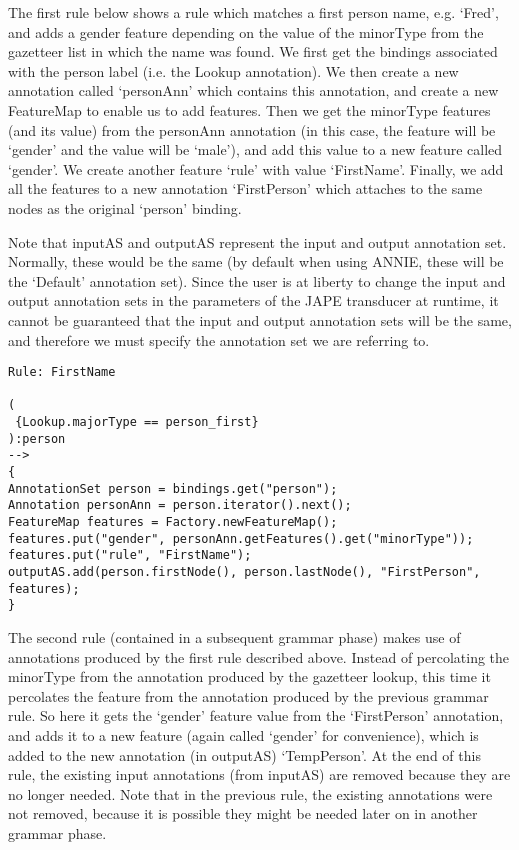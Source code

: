 The first rule below shows a rule which matches a first person name,
e.g. `Fred', and adds a gender feature depending on the value of the
minorType from the gazetteer list in which the name was found.
We first get the bindings associated with the person label (i.e. the
Lookup annotation). We then create a new annotation called
`personAnn' which contains this annotation, and create a new
FeatureMap to enable us to add features. Then we get the minorType
features (and its value) from the personAnn annotation (in this case,
the feature will be `gender' and the value will be `male'), and
add this value to a new feature called `gender'. We create another
feature `rule' with value `FirstName'. Finally, we add all the
features to a new annotation `FirstPerson' which attaches to the
same nodes as the original `person' binding.

Note that inputAS and outputAS represent the input and output
annotation set. Normally, these would be the same (by default when
using ANNIE, these will be the `Default' annotation set). Since the
user is at liberty to change the input and output annotation sets in
the parameters of the JAPE transducer at runtime, it cannot be
guaranteed that the input and output annotation sets will be the same,
and therefore we must specify the annotation set we are referring to.


\begin{small}
\begin{verbatim}
Rule: FirstName

(
 {Lookup.majorType == person_first}
):person
-->
{
AnnotationSet person = bindings.get("person");
Annotation personAnn = person.iterator().next();
FeatureMap features = Factory.newFeatureMap();
features.put("gender", personAnn.getFeatures().get("minorType"));
features.put("rule", "FirstName");
outputAS.add(person.firstNode(), person.lastNode(), "FirstPerson",
features);
}
\end{verbatim}
\end{small}

The second rule (contained in a subsequent grammar phase) makes use of
annotations produced by the first rule described above. Instead of
percolating the minorType from the annotation produced by the
gazetteer lookup, this time it percolates the feature from the
annotation produced by the previous grammar rule. So here it gets the
`gender' feature value from the `FirstPerson' annotation, and adds it to
a new feature (again called `gender' for convenience), which is
added to the new annotation (in outputAS) `TempPerson'. At the end of this rule,
the existing input annotations (from inputAS) are removed because they are no longer
needed. Note that in the previous rule, the existing annotations were
not removed, because it is possible they might be needed later on in
another grammar phase.


